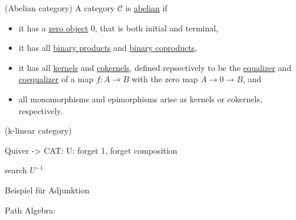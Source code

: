 \begin{definition}{(Abelian category)}
A category $\mathcal{C}$ is \ul{abelian} if
\begin{itemize}
\item it has a \ul{zero object} $0$, that is both initial and terminal,
\item it has all \ul{binary products} and \ul{binary coproducts},
\item it has all \ul{kernels} and \ul{cokernels}, defined repsectively to be the \ul{equalizer} and
\ul{coequalizer} of a map $f : A \rightarrow B$ with the zero map $A \rightarrow 0 \rightarrow B$, and
\item all monomorphisms and epimorphisms arise as kernels or cokernels, respectively.
\end{itemize}
\end{definition}

\begin{definition}{(k-linear category)}

\end{definition}


Quiver -> CAT: U: forget 1, forget composition

search $U^{-1}$

Beispiel für Adjunktion


Path Algebra: